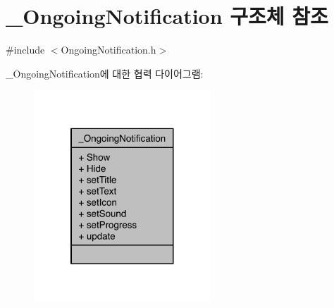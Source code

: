 \hypertarget{struct___ongoing_notification}{\section{\-\_\-\-Ongoing\-Notification 구조체 참조}
\label{struct___ongoing_notification}
}


{\ttfamily \#include $<$Ongoing\-Notification.\-h$>$}



\-\_\-\-Ongoing\-Notification에 대한 협력 다이어그램\-:\nopagebreak
\begin{figure}[H]
\begin{center}
\leavevmode
\includegraphics[width=188pt]{df/da2/struct___ongoing_notification__coll__graph}
\end{center}
\end{figure}
